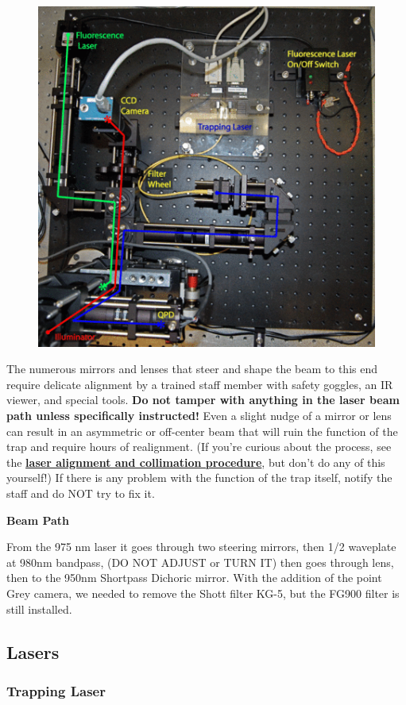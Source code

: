 \documentclass{../lab}
\begin{document}
\begin{figure}[h]
    \centering
    \href{http://experimentationlab.berkeley.edu/sites/default/files/images/450px-OTZ_From_Above.gif}{\includegraphics[width=0.5\linewidth]{images/450px-OTZ_From_Above.png}}
    \caption{}
    \label{fig:450px-OTZ_From_Above}
\end{figure}

The numerous mirrors and lenses that steer and shape the beam to this end require delicate alignment by a trained staff member with safety goggles, an IR viewer, and special tools. \textbf{Do not tamper with anything in the laser beam path unless specifically instructed!} Even a slight nudge of a mirror or lens can result in an asymmetric or off-center beam that will ruin the function of the trap and require hours of realignment. (If you're curious about the process, see the \href{http://experimentationlab.berkeley.edu/DesignandDocumentationOTZ#Laser\_Alignment\_and\_Collimation}{\textbf{laser alignment and collimation procedure}}, but don't do any of this yourself!) If there is any problem with the function of the trap itself, notify the staff and do NOT try to fix it.

\textbf{Beam Path}

From the 975 nm laser it goes through two steering mirrors, then 1/2 waveplate at 980nm bandpass, (DO NOT ADJUST or TURN IT) then goes through lens, then to the 950nm Shortpass Dichoric mirror. With the addition of the point Grey camera, we needed to remove the Shott filter KG-5, but the FG900 filter is still installed.

\subsection{Lasers}

\subsubsection{Trapping Laser}
\end{document}
